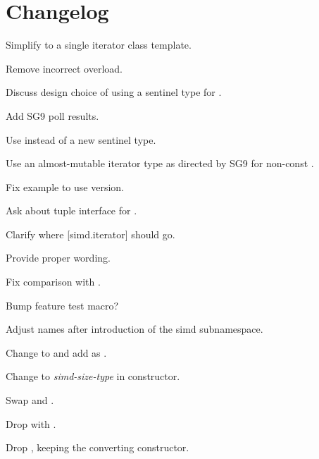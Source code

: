 \section{Changelog}
\begin{revision}
\item Simplify to a single iterator class template.
\item Remove incorrect  overload.
\item Discuss design choice of using a sentinel type for .
\end{revision}

\begin{revision}
\item Add SG9 poll results.
\item Use  instead of a new sentinel type.
\item Use an almost-mutable iterator type as directed by SG9 for
  non-const .
\item Fix  example to use  version.
\end{revision}

\begin{revision}
\item Ask about tuple interface for .
\item Clarify where [simd.iterator] should go.
\item Provide proper wording.
\item Fix \code{<=>} comparison with .
\item Bump feature test macro?
\end{revision}

\begin{revision}
\item Adjust names after introduction of the simd subnamespace.
\end{revision}

\begin{revision}
\item Change  to  and add  as .
\item Change  to \textit{simd-size-type} in constructor.
\item Swap  and .
\item Drop  with .
\item Drop , keeping the converting constructor.
\end{revision}
